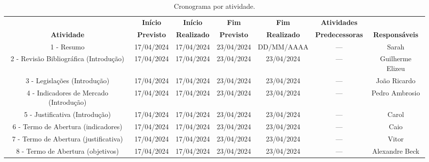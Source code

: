 \begin{landscape}
\begin{table}[htpb]
\begin{center}
\caption{Cronograma por atividade.}
\begin{tabular}{|c|c|c|c|c|c|c|}
\hline
& \textbf{Início} & \textbf{Início} & \textbf{Fim} & \textbf{Fim} & \textbf{Atividades} & \\
\textbf{Atividade} & \textbf{Previsto} & \textbf{Realizado} & \textbf{Previsto} & \textbf{Realizado} & \textbf{Predecessoras} & \textbf{Responsáveis}\\ \hline
1 - Resumo                       & 17/04/2024               & 17/04/2024                & 23/04/2024               & DD/MM/AAAA                & ---                           & Sarah \\ \hline
2 - Revisão Bibliográfica (Introdução)                       & 17/04/2024               & 17/04/2024                & 23/04/2024               & 23/04/2024                & ---                               & Guilherme Elizeu \\ \hline
3 - Legislações (Introdução)                      & 17/04/2024               & 17/04/2024                & 23/04/2024               & 23/04/2024                & ---                                 & João Ricardo \\ \hline
4 - Indicadores de Mercado (Introdução)                      & 17/04/2024               & 17/04/2024                & 23/04/2024               & 23/04/2024                & ---                              & Pedro Ambrosio \\ \hline
5 - Justificativa (Introdução)                      & 17/04/2024               & 17/04/2024                & 23/04/2024               & 23/04/2024                & ---                                 & Carol \\ \hline
6 - Termo de Abertura (indicadores)                       & 17/04/2024               & 17/04/2024                & 23/04/2024               & 23/04/2024                & ---                           & Caio \\ \hline
7 - Termo de Abertura (justificativa)                       & 17/04/2024               & 17/04/2024                & 23/04/2024               & 23/04/2024                & ---                           & Vitor \\ \hline
8 - Termo de Abertura (objetivos)                       & 17/04/2024               & 17/04/2024                & 23/04/2024               & 23/04/2024                & ---                           & Alexandre Beck \\ \hline

\end{tabular}
\end{center}
\end{table}
\end{landscape}
